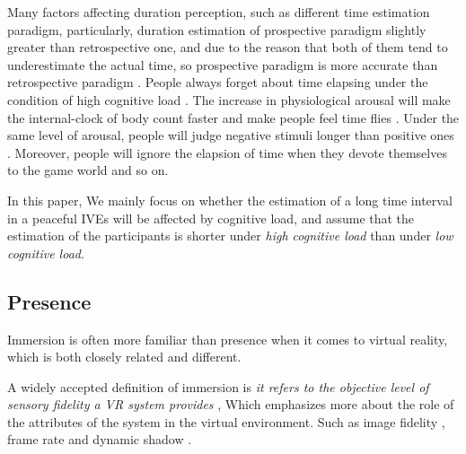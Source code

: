 \documentclass[sigconf]{acmart}
\begin{document}
Many factors affecting duration perception, such as different time estimation paradigm, particularly, duration estimation of prospective paradigm slightly greater than retrospective one, and due to the reason that both of them tend to underestimate the actual time, so prospective paradigm is more accurate than retrospective paradigm \cite{block1997prospective,buhusi2005makes,gibbon1997toward,赵雪2012时距知觉研究综述,杨珍2006时距估计范式与方法效应的实验研究}. People always forget about time elapsing under the condition of high cognitive load \cite{gibbon1984scalar}. The increase in physiological arousal will make the internal-clock of body count faster and make people feel time flies \cite{angrilli1997influence,burle2001dissociation}. Under the same level of arousal, people will judge negative stimuli longer than positive ones \cite{droit2007emotions, noulhiane2007emotional}. Moreover, people will ignore the elapsion of time when they devote themselves to the game world \cite{sanders2010time, schatzschneider2016turned, jancke2009virtual} and so on.


In this paper, We mainly focus on whether the estimation of a long time interval in a peaceful IVEs will be affected by cognitive load, and assume that the estimation of the participants is shorter under \emph{high cognitive load} than under \emph{low cognitive load}.

\subsection{Presence}


Immersion is often more familiar than presence when it comes to virtual reality, which is both closely related and different.


A widely accepted definition of immersion is \emph{it refers to the objective level of sensory fidelity a VR system provides} \cite{meehan2002physiological}, Which emphasizes more about the role of the attributes of the system in the virtual environment. Such as image fidelity \cite{welch1996effects}, frame rate \cite{chan1996effects} and dynamic shadow \cite{slater1995influence}.
\end{document}
